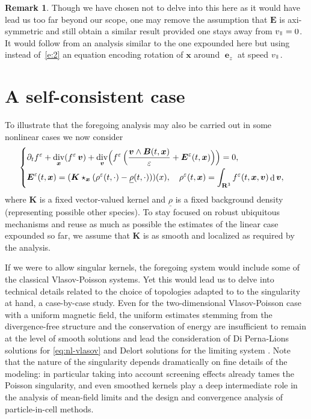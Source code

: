 \documentclass[10pt]{amsart}
\newenvironment{splitcases}
{\begin{cases}\begin{aligned}}
{\end{aligned}\end{cases}}
\let\eps\varepsilon
\let\d\partial
\DeclareMathOperator\dD{d}\let\dd\dD
\DeclareMathOperator{\Div}{div}
\theoremstyle{plain}
\theoremstyle{definition}
\newtheorem{remark}[theorem]{Remark}
\newcommand\br{\begin{remark}}
\newcommand\er{\end{remark}}
\newcommand{\be}{\begin{equation}}
\newcommand{\ee}{\end{equation}}
\newcommand\R{\mathbf R}
\newcommand\bB{{\boldsymbol B}}
\newcommand\bE{{\boldsymbol E}}
\newcommand\bK{{\boldsymbol K}}
\newcommand\bfv{{\boldsymbol v}}
\newcommand\bfx{{\boldsymbol x}}
\newcommand\urho{{\underline \rho}}
\DeclareMathOperator{\beD}{\boldsymbol{e}}
\newcommand\eDz{\beD_z}
\newcommand\vpar{v_\mypar}
\newcommand{\mypar}{{\mkern3mu\vphantom{\perp}\vrule depth 0pt\mkern2mu\vrule depth 0pt\mkern3mu}}
\begin{document}
\br\label{rk:axi}
Though we have chosen not to delve into this here as it would have lead us too far beyond our scope, one may remove the assumption that $\bE$ is axi-symmetric and still obtain a similar result provided one stays away from $\vpar=0$. It would follow from an analysis similar to the one expounded here but using instead of~\eqref{e:2} an equation encoding rotation of $\bfx$ around $\eDz$ at speed $\vpar$.
\er

\section{A self-consistent case}\label{s:nl}

To illustrate that the foregoing analysis may also be carried out in some nonlinear cases we now consider
\be\label{eq:nl-vlasov}
\begin{splitcases}
&\d_t f^\eps+\Div_\bfx(f^\eps\,\bfv)
+\Div_\bfv\Bigl(f^\eps\,\Bigl(\frac{\bfv\wedge \bB(t,\bfx)}{\eps}+\bE^\eps(t,\bfx)\Bigr)\Bigr)=0,\\
&\bE^\eps(t,\bfx)=(\bK\star_{\bfx}(\rho^\eps(t,\cdot)-\urho(t,\cdot)))(x),\quad
\rho^\eps(t,\bfx)=\int_{\R^3}f^\eps(t,\bfx,\bfv)\dD \bfv,
\end{splitcases}
\ee
where $\bK$ is a fixed vector-valued kernel and $\urho$ is a fixed background density (representing possible other species). To stay focused on robust ubiquitous mechanisms and reuse as much as possible the estimates of the linear case expounded so far, we assume that $\bK$ is as smooth and localized as required by the analysis.

If we were to allow singular kernels, the foregoing system would include some of the classical Vlasov-Poisson systems. Yet this would lead us to delve into technical details related to the choice of topologies adapted to to the singularity at hand, a case-by-case study. Even for the two-dimensional Vlasov-Poisson case with a uniform magnetic field, the uniform estimates stemming from the divergence-free structure and the conservation of energy are insufficient to remain at the level of smooth solutions and lead the consideration of Di Perna-Lions solutions for \eqref{eq:nl-vlasov} and Delort solutions for the limiting system \cite{Miot-2D-gyrokinetic}. Note that the nature of the singularity depends dramatically on fine details of the modeling: in particular taking into account screening effects already tames the Poisson singularity, and even smoothed kernels play a deep intermediate role in the analysis of mean-field limits and the design and convergence analysis of particle-in-cell methods.
\end{document}
